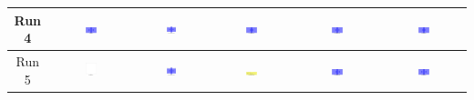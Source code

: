 \begin{table}[H]
\begin{tabular}{|c|c|c|c|c|c|}
    \hline
    Run 4 & \includegraphics[width=0.15\textwidth]{./run_4/png/gpt-4o_results/BasicLayout.png} & \includegraphics[width=0.15\textwidth]{./run_4/png/claude-3-5-sonnet-20240620_results/BasicLayout.png} & \includegraphics[width=0.15\textwidth]{./run_4/png/watsonx_meta-llama_llama-3-1-70b-instruct_results/BasicLayout.png} & \includegraphics[width=0.15\textwidth]{./run_4/png/watsonx_meta-llama_llama-3-405b-instruct_results/BasicLayout.png} & \includegraphics[width=0.15\textwidth]{./run_4/png/o1-preview_results/BasicLayout.png} \\
    \hline
    Run 5 & \includegraphics[width=0.15\textwidth]{./run_5/png/gpt-4o_results/BasicLayout.png} & \includegraphics[width=0.15\textwidth]{./run_5/png/claude-3-5-sonnet-20240620_results/BasicLayout.png} & \includegraphics[width=0.15\textwidth]{./run_5/png/watsonx_meta-llama_llama-3-1-70b-instruct_results/BasicLayout.png} & \includegraphics[width=0.15\textwidth]{./run_5/png/watsonx_meta-llama_llama-3-405b-instruct_results/BasicLayout.png} & \includegraphics[width=0.15\textwidth]{./run_5/png/o1-preview_results/BasicLayout.png} \\

\end{tabular}
\end{table}
